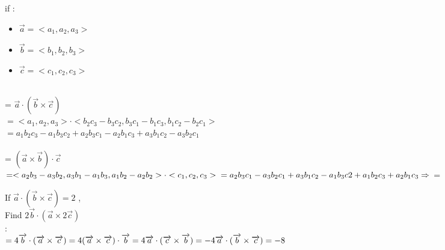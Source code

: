{\color{smalt(darkpowderblue)}{Pf(5)}} if :
\begin{itemize}
\item $\overrightarrow{a} = <a_{1} , a_{2} , a_{3} >$
\item $\overrightarrow{b} = < b_{1} , b_{2} , b_{3} >$
\item $\overrightarrow{c} = <c_{1} , c_{2} , c_{3}>$
\end{itemize}
{}\\ = $\overrightarrow{a} \cdot (\overrightarrow{b} \times \overrightarrow{c})$\\
$= <a_{1},a_{2},a_{3}> \cdot <b_{2}c_{3} - b_{3}c_{2} , b_{3}c_{1} - b_{1}c_{3} , b_{1}c_{2} -b_{2}c_{1} >$\\
$= a_{1}b_{2}c_{3} - a_{1}b_{3}c_{2} + a_{2}b_{3}c_{1} - a_{2}b_{1}c_{3} + a_{3}b_{1}c_{2} - a_{3}b_{2}c_{1}$\\
{}\\ = $(\overrightarrow{a} \times \overrightarrow{b}) \cdot \overrightarrow{c}$\\
$= <a_{2}b_{3} - a_{3}b_{2} , a_{3}b_{1} - a_{1}b_{3} , a_{1}b_{2} - a_{2}b_{2} > \cdot <c_{1} , c_{2}, c_{3} >\\
= a_{2}b_{3}c_{1} - a_{3}b_{2}c_{1} + a_{3}b_{1}c_{2} - a_{1}b_{3}c{2} + a_{1}b_{2}c_{3} + a_{2}b_{1}c_{3}\\
\Rightarrow$ {\color{smalt(darkpowderblue)}{L.H.S }}={\color{smalt(darkpowderblue)}{ R.H.S}} \\
\noindent{\color{smalt(darkpowderblue)}\rule{\linewidth}{.2mm}}
\begin{example}
If  $\overrightarrow{a}\cdot(\overrightarrow{b} \times \overrightarrow{c}) = 2$ ,\\ Find $2 \overrightarrow {b} \cdot (\overrightarrow{a} \times 2 \overrightarrow{c})$\\
{} : \\
$ = 4 \overrightarrow{b} \cdot (\overrightarrow{a} \times \overrightarrow{c})\\
= 4 (\overrightarrow{a} \times \overrightarrow{c}) \cdot \overrightarrow{b}\\
= 4 \overrightarrow{a} \cdot (\overrightarrow{c} \times \overrightarrow{b})\\
= -4 \overrightarrow{a} \cdot (\overrightarrow{b} \times \overrightarrow{c})\\ =-8$\end{example}
